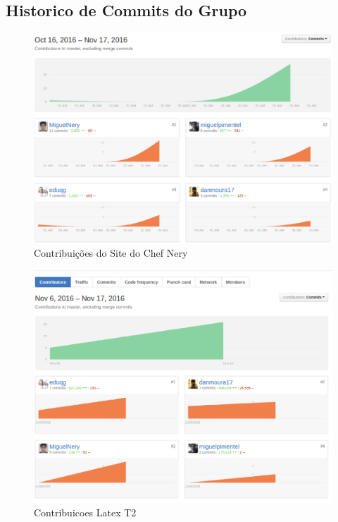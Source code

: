 \begin{apendicesenv}
\chapter{Historico de Commits do Grupo}

\begin{figure}[h]
    \centering
    \label{fig01}
        \includegraphics[keepaspectratio=true,scale=0.4]{figuras/ContribuicoesSite.eps}
    \caption{Contribuições do Site do Chef Nery}
\end{figure}

\begin{figure}[h]
    \centering
    \label{fig01}
        \includegraphics[keepaspectratio=true,scale=0.4]{figuras/ContribuicoesT2.eps}
    \caption{Contribuicoes Latex T2}
\end{figure}

\end{apendicesenv}
